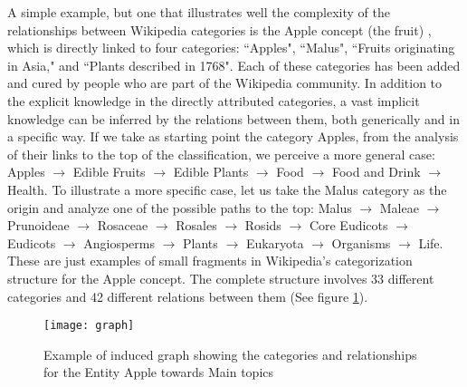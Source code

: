 A simple example, but one that illustrates well the complexity of the relationships between Wikipedia categories is the Apple concept (the fruit) , which is directly linked to four categories: ``Apples", ``Malus", ``Fruits originating in Asia," and ``Plants described in 1768". Each of these categories has been added and cured by people who are part of the Wikipedia community. In addition to the explicit knowledge in the directly attributed categories, a vast implicit knowledge can be inferred by the relations between them, both generically and in a specific way. If we take as starting point the category Apples, from the analysis of their links to the top of the classification, we perceive a more general case: Apples $\rightarrow$  Edible Fruits $\rightarrow$ Edible Plants $\rightarrow$ Food $\rightarrow$ Food and Drink $\rightarrow$ Health.
To illustrate a more specific case, let us take the Malus category as the origin and analyze one of the possible paths to the top: Malus $\rightarrow$ Maleae $\rightarrow$ Prunoideae $\rightarrow$ Rosaceae $\rightarrow$ Rosales $\rightarrow$ Rosids $\rightarrow$ Core Eudicots $\rightarrow$ Eudicots $\rightarrow$ Angiosperms $\rightarrow$ Plants $\rightarrow$ Eukaryota $\rightarrow$ Organisms $\rightarrow$ Life.
These are just examples of small fragments in Wikipedia's categorization structure for the Apple concept. The complete structure involves 33 different categories and 42 different relations between them (See figure \ref{fig:semantics-category-apple}).


\begin{figure}[H]
\centering
  \texttt{[image: graph]}
  \caption{Example of induced graph showing the categories and relationships for the Entity Apple towards Main topics}
  \label{fig:semantics-category-apple}
\end{figure}






